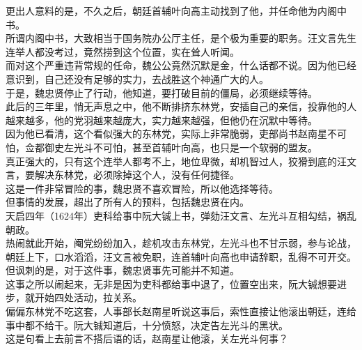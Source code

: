 \begin{multicols}{\theparacolNo}
更出人意料的是，不久之后，朝廷首辅叶向高主动找到了他，并任命他为内阁中书。\\

所谓内阁中书，大致相当于国务院办公厅主任，是个极为重要的职务。汪文言先生连举人都没考过，竟然捞到这个位置，实在耸人听闻。\\

而对这个严重违背常规的任命，魏公公竟然沉默是金，什么话都不说。因为他已经意识到，自己还没有足够的实力，去战胜这个神通广大的人。\\

于是，魏忠贤停止了行动，他知道，要打破目前的僵局，必须继续等待。\\

此后的三年里，悄无声息之中，他不断排挤东林党，安插自己的亲信，投靠他的人越来越多，他的党羽越来越庞大，实力越来越强，但他仍在沉默中等待。\\

因为他已看清，这个看似强大的东林党，实际上非常脆弱，吏部尚书赵南星不可怕，佥都御史左光斗不可怕，甚至首辅叶向高，也只是一个软弱的盟友。\\

真正强大的，只有这个连举人都考不上，地位卑微，却机智过人，狡猾到底的汪文言，要解决东林党，必须除掉这个人，没有任何捷径。\\

这是一件非常冒险的事，魏忠贤不喜欢冒险，所以他选择等待。\\

但事情的发展，超出了所有人的预料，包括魏忠贤在内。\\

天启四年（1624年）吏科给事中阮大铖上书，弹劾汪文言、左光斗互相勾结，祸乱朝政。\\

热闹就此开始，阉党纷纷加入，趁机攻击东林党，左光斗也不甘示弱，参与论战，朝廷上下，口水滔滔，汪文言被免职，连首辅叶向高也申请辞职，乱得不可开交。\\

但讽刺的是，对于这件事，魏忠贤事先可能并不知道。\\

这事之所以闹起来，无非是因为吏科都给事中退了，位置空出来，阮大铖想要进步，就开始四处活动，拉关系。\\

偏偏东林党不吃这套，人事部长赵南星听说这事后，索性直接让他滚出朝廷，连给事中都不给干。阮大铖知道后，十分愤怒，决定告左光斗的黑状。\\

这是句看上去前言不搭后语的话，赵南星让他滚，关左光斗何事？\\


\end{multicols}
